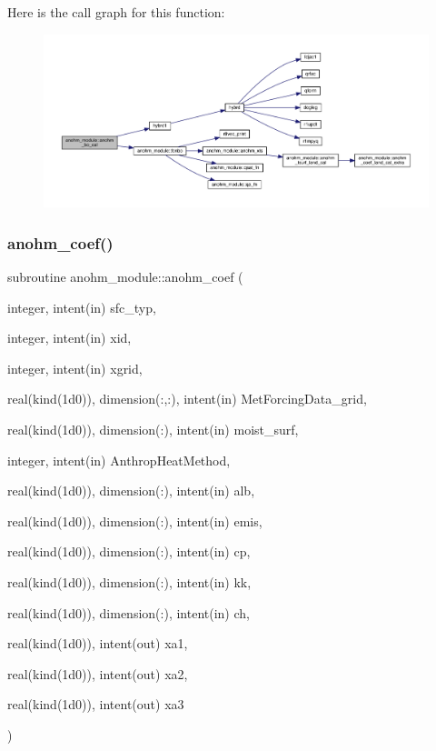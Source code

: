Here is the call graph for this function\+:\nopagebreak
\begin{figure}[H]
\begin{center}
\leavevmode
\includegraphics[width=350pt]{namespaceanohm__module_a7c747a2204089f0681ae47c92bf7d1e0_cgraph}
\end{center}
\end{figure}
\mbox{\label{namespaceanohm__module_a5aa773c6b5c4a66155eaeb1c86c70471}} 
\subsubsection{\texorpdfstring{anohm\+\_\+coef()}{anohm\_coef()}}
{\footnotesize\ttfamily subroutine anohm\+\_\+module\+::anohm\+\_\+coef (\begin{DoxyParamCaption}\item[{integer, intent(in)}]{sfc\+\_\+typ,  }\item[{integer, intent(in)}]{xid,  }\item[{integer, intent(in)}]{xgrid,  }\item[{real(kind(1d0)), dimension(\+:,\+:), intent(in)}]{Met\+Forcing\+Data\+\_\+grid,  }\item[{real(kind(1d0)), dimension(\+:), intent(in)}]{moist\+\_\+surf,  }\item[{integer, intent(in)}]{Anthrop\+Heat\+Method,  }\item[{real(kind(1d0)), dimension(\+:), intent(in)}]{alb,  }\item[{real(kind(1d0)), dimension(\+:), intent(in)}]{emis,  }\item[{real(kind(1d0)), dimension(\+:), intent(in)}]{cp,  }\item[{real(kind(1d0)), dimension(\+:), intent(in)}]{kk,  }\item[{real(kind(1d0)), dimension(\+:), intent(in)}]{ch,  }\item[{real(kind(1d0)), intent(out)}]{xa1,  }\item[{real(kind(1d0)), intent(out)}]{xa2,  }\item[{real(kind(1d0)), intent(out)}]{xa3 }\end{DoxyParamCaption})}



